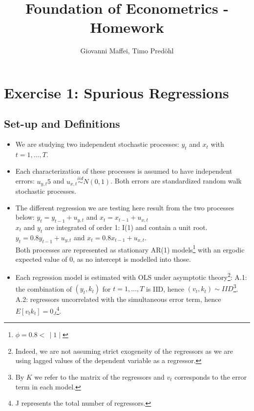 \documentclass[12pt]{article}
\title{Foundation of Econometrics - Homework}
\author{Giovanni Maffei, Timo Predöhl}
\newcommand{\replacedTP}[2]{\replaced[id=tp]{#2}{#1}}
\begin{document}
	
	\maketitle
	
	\begin{spacing}{1}
		\tableofcontents		
	\end{spacing}
	
	\pagebreak

	\section{Exercise 1: Spurious Regressions}
	\subsection{Set-up and Definitions}
	\begin{itemize}
		\item We are studying two independent stochastic processes: $y_t$ and $x_t$  with $t=1,...,T$.
		\item Each characterization of these processes is assumed to have independent errors: $u_{y,t} 5$ and $u_{x,t} \overset{iid}{\sim}N(0,1)$.
			\subitem Both errors are standardized random walk stochastic processes.
		\item The different regression \replacedTP{modeles}{models} we are testing here result from the two processes below:
			\subitem $y_t = y_{t-1} + u_{y,t}$ and $x_t = x_{t-1} + u_{x,t}$ \vspace{0.5em}\\ 
			$x_t$ and $y_t$ are integrated of order 1: I(1) and contain a unit root.
			\subitem $y_t = 0.8y_{t-1} + u_{y,t}$ and $x_t = 0.8x_{t-1} + u_{x,t}$.\vspace{0.5em}\\
			Both processes are represented as stationary AR(1) models\footnote{$\phi = 0.8 < \,\mid1\mid$} with an ergodic expected value of 0, as no intercept is modelled into those.
		\item Each regression model is estimated with OLS under asymptotic theory\footnote{Indeed, we are not assuming strict exogeneity of the regressors as we are using lagged values of the dependent variable as a regressor.}:
			\subitem A.1: the combination of $(y_t, k_t)$ for $t = 1,...,T$ is IID, hence $(v_t, k_t)\sim IID$\footnote{By $K$ we refer to the matrix of the regressors and $v_t$ corresponds to the error term in each model.}.
			\subitem A.2: regressors uncorrelated with the simultaneous error term, hence $E[v_{t}k_{t}]=0_J$\footnote{J represents the total number of regressors.}.

\end{itemize}
\end{document}
